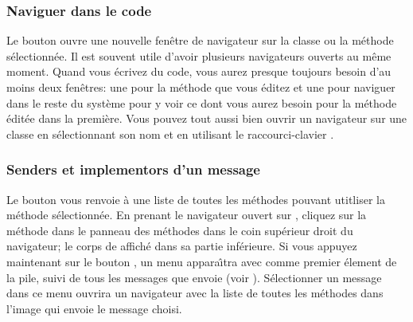 \documentclass[a4paper,10pt,twoside]{book}
\begin{document}
\subsubsection{Naviguer dans le code}
\label{sec:browsing}

Le bouton  ouvre une nouvelle fen\^etre de navigateur sur
la classe ou la m\'ethode s\'electionn\'ee. Il est souvent utile d'avoir
plusieurs navigateurs ouverts au m\^eme moment. Quand vous
\'ecrivez du code, vous aurez presque toujours besoin d'au moins deux
fen\^etres: une pour la m\'ethode que vous \'editez et une pour naviguer
dans le reste du syst\`eme pour y voir ce dont vous aurez besoin pour la
m\'ethode \'edit\'ee dans la premi\`ere. Vous pouvez tout aussi bien
ouvrir un navigateur sur une classe en s\'electionnant son nom et en utilisant le raccourci-clavier  .


\subsubsection{Senders et implementors d'un message}
\label{sec:sendersImplementors}

Le bouton  vous renvoie \`a une liste de toutes les m\'ethodes
pouvant utitliser la m\'ethode s\'electionn\'ee. En prenant le navigateur ouvert sur , cliquez sur la m\'ethode  dans le panneau des m\'ethodes dans le coin sup\'erieur droit du navigateur;
le corps
 de  affich\'e dans sa partie inf\'erieure.
Si vous appuyez maintenant sur le bouton , 
un menu appara\^{\i}tra avec  comme premier \'element de
la pile, suivi de tous les messages que  envoie (voir ). 
S\'electionner un message dans ce menu ouvrira un navigateur avec la liste de toutes les m\'ethodes dans l'image qui envoie le message choisi.
\end{document}
